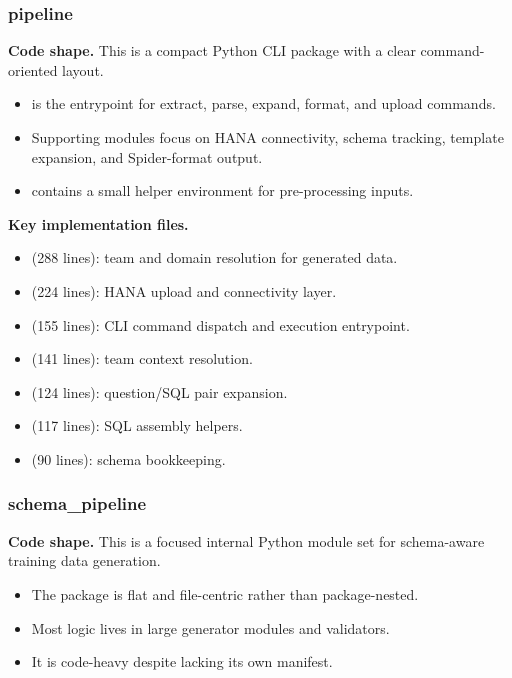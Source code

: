 \documentclass[11pt,a4paper]{article}
\begin{document}
\subsubsection{pipeline}

\textbf{Code shape.} This is a compact Python CLI package with a clear command-oriented layout.
\begin{itemize}[leftmargin=*]
    \item {} is the entrypoint for extract, parse, expand, format, and upload commands.
    \item Supporting modules focus on HANA connectivity, schema tracking, template expansion, and Spider-format output.
    \item {} contains a small helper environment for pre-processing inputs.
\end{itemize}

\textbf{Key implementation files.}
\begin{itemize}[leftmargin=*]
    \item {} (288 lines): team and domain resolution for generated data.
    \item {} (224 lines): HANA upload and connectivity layer.
    \item {} (155 lines): CLI command dispatch and execution entrypoint.
    \item {} (141 lines): team context resolution.
    \item {} (124 lines): question/SQL pair expansion.
    \item {} (117 lines): SQL assembly helpers.
    \item {} (90 lines): schema bookkeeping.
\end{itemize}

\subsubsection{schema\_pipeline}

\textbf{Code shape.} This is a focused internal Python module set for schema-aware training data generation.
\begin{itemize}[leftmargin=*]
    \item The package is flat and file-centric rather than package-nested.
    \item Most logic lives in large generator modules and validators.
    \item It is code-heavy despite lacking its own manifest.
\end{itemize}
\end{document}
